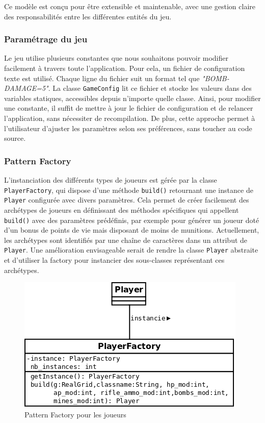 \documentclass[12pt]{article}
\begin{document}
Ce modèle est conçu pour être extensible et maintenable, avec une gestion claire des responsabilités entre les différentes entités du jeu.

\subsubsection{Paramétrage du jeu}
Le jeu utilise plusieurs constantes que nous souhaitons pouvoir modifier facilement à travers toute l’application.
Pour cela, un fichier de configuration texte est utilisé. Chaque ligne du fichier suit un format tel que \textit{"BOMB-DAMAGE=5"}. La classe \texttt{GameConfig} lit ce fichier et stocke les valeurs dans des variables statiques, accessibles depuis n’importe quelle classe.
Ainsi, pour modifier une constante, il suffit de mettre à jour le fichier de configuration et de relancer l’application, sans nécessiter de recompilation. De plus, cette approche permet à l'utilisateur d’ajuster les paramètres selon ses préférences, sans toucher au code source.

\subsubsection{Pattern Factory}
L’instanciation des différents types de joueurs est gérée par la classe \texttt{PlayerFactory}, qui dispose d’une méthode \texttt{build()} retournant une instance de \texttt{Player} configurée avec divers paramètres.
Cela permet de créer facilement des archétypes de joueurs en définissant des méthodes spécifiques qui appellent \texttt{build()} avec des paramètres prédéfinis, par exemple pour générer un joueur doté d’un bonus de points de vie mais disposant de moins de munitions.
Actuellement, les archétypes sont identifiés par une chaîne de caractères dans un attribut de \texttt{Player}. Une amélioration envisageable serait de rendre la classe \texttt{Player} abstraite et d’utiliser la factory pour instancier des sous-classes représentant ces archétypes.

\begin{figure}[!h] \centering \includegraphics[scale=0.5]{images/factory.png} \caption{Pattern Factory pour les joueurs} \end{figure}
\end{document}
